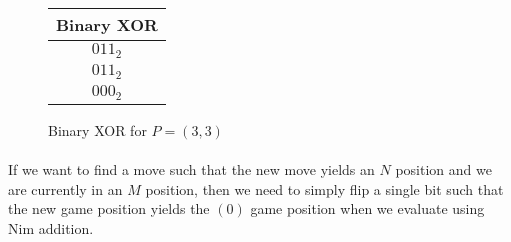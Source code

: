 \documentclass{article}
\begin{document}
\begin{figure}[h]
\centering
\begin{tabular}{|c|}
\hline
Binary XOR\\
\hline
$011_{2}$\\
$011_{2}$\\
\hline
$000_{2}$\\
\hline
\end{tabular}
\caption{Binary XOR for $P = (3,3)$}
\end{figure}

\paragraph{}
If we want to find a move such that the new move yields an $N$ position and we are currently in an $M$ position, then we need to simply flip a single bit such that the new game position yields the $(0)$ game position when we evaluate using Nim addition. 
\end{document}
